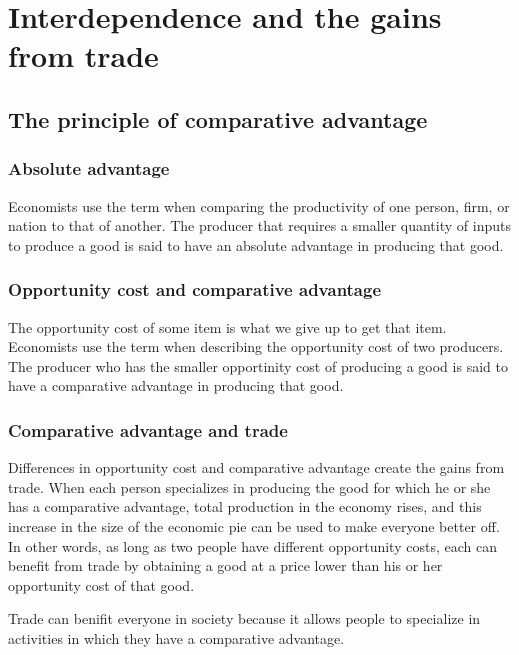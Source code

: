 
\chapter{Interdependence and the gains from trade}

\section{The principle of comparative advantage}

\subsection{Absolute advantage}

Economists use the term  when comparing the productivity of one person, firm, or nation to that of another.
The producer that requires a smaller quantity of inputs to produce a good is said to have an absolute advantage in producing that good.

\subsection{Opportunity cost and comparative advantage}

The opportunity cost of some item is what we give up to get that item.
Economists use the term  when describing the opportunity cost of two producers.
The producer who has the smaller opportinity cost of producing a good is said to have a comparative advantage in producing that good.

\subsection{Comparative advantage and trade}

Differences in opportunity cost and comparative advantage create the gains from trade.
When each person specializes in producing the good for which he or she has a comparative advantage, total production in the economy rises, and this increase in the size of the economic pie can be used to make everyone better off.
In other words, as long as two people have different opportunity costs, each can benefit from trade by obtaining a good at a price lower than his or her opportunity cost of that good.



Trade can benifit everyone in society because it allows people to specialize in activities in which they have a comparative advantage.


